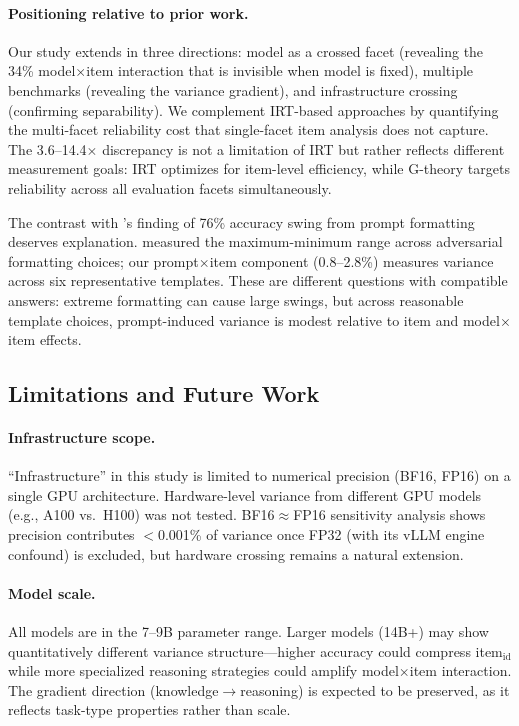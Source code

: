 \documentclass[letterpaper,11pt]{article}
\begin{document}
\paragraph{Positioning relative to prior work.}
Our study extends \citet{mesting2026reliability} in three directions: model as a crossed facet (revealing the 34\% model$\times$item interaction that is invisible when model is fixed), multiple benchmarks (revealing the variance gradient), and infrastructure crossing (confirming separability).
We complement IRT-based approaches \citep{polo2024tinybenchmarks} by quantifying the multi-facet reliability cost that single-facet item analysis does not capture.
The 3.6--14.4$\times$ discrepancy is not a limitation of IRT but rather reflects different measurement goals: IRT optimizes for item-level efficiency, while G-theory targets reliability across all evaluation facets simultaneously.

The contrast with \citet{sclar2024quantifying}'s finding of 76\% accuracy swing from prompt formatting deserves explanation.
\citeauthor{sclar2024quantifying} measured the maximum-minimum range across adversarial formatting choices; our prompt$\times$item component (0.8--2.8\%) measures variance across six representative templates.
These are different questions with compatible answers: extreme formatting can cause large swings, but across reasonable template choices, prompt-induced variance is modest relative to item and model$\times$item effects.

\subsection{Limitations and Future Work}
\label{sec:limitations}

\paragraph{Infrastructure scope.}
``Infrastructure'' in this study is limited to numerical precision (BF16, FP16) on a single GPU architecture.
Hardware-level variance from different GPU models (e.g., A100 vs.\ H100) was not tested.
BF16$\approx$FP16 sensitivity analysis shows precision contributes $<$0.001\% of variance once FP32 (with its vLLM engine confound) is excluded, but hardware crossing remains a natural extension.

\paragraph{Model scale.}
All models are in the 7--9B parameter range.
Larger models (14B+) may show quantitatively different variance structure---higher accuracy could compress item$_{\text{id}}$ while more specialized reasoning strategies could amplify model$\times$item interaction.
The gradient direction (knowledge$\to$reasoning) is expected to be preserved, as it reflects task-type properties rather than scale.
\end{document}
